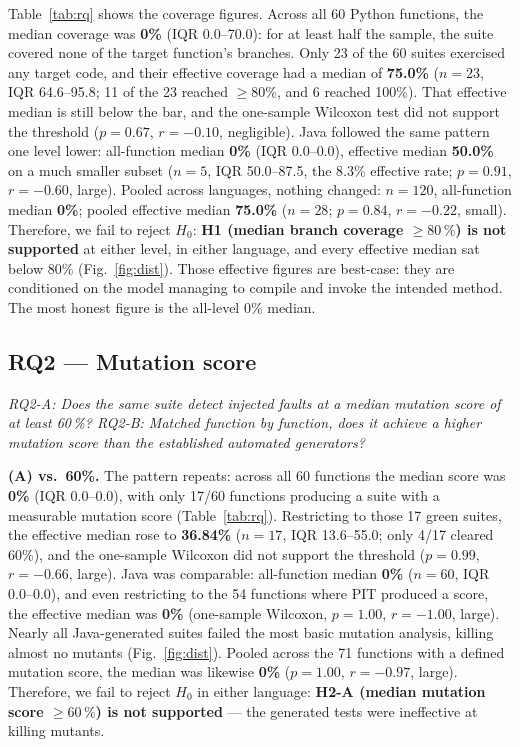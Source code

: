 Table~\ref{tab:rq} shows the coverage figures. Across all 60 Python functions, the median
coverage was \textbf{0\%} (IQR 0.0--70.0): for at least half the sample, the suite covered
none of the target function's branches. Only 23 of the 60 suites exercised any target code,
and their effective coverage had a median of \textbf{75.0\%} ($n=23$, IQR 64.6--95.8; 11 of
the 23 reached $\ge 80\%$, and 6 reached 100\%). That effective median is still below the
bar, and the one-sample Wilcoxon test did not support the threshold ($p=0.67$, $r=-0.10$,
negligible). Java followed the same pattern one level lower: all-function median
\textbf{0\%} (IQR 0.0--0.0), effective median \textbf{50.0\%} on a much smaller subset
($n=5$, IQR 50.0--87.5, the 8.3\% effective rate; $p=0.91$, $r=-0.60$, large). Pooled across
languages, nothing changed: $n=120$, all-function median \textbf{0\%}; pooled effective
median \textbf{75.0\%} ($n=28$; $p=0.84$, $r=-0.22$, small). Therefore, we fail to reject
$H_0$: \textbf{H1 (median branch coverage $\ge 80\,\%$) is not supported} at either level, in
either language, and every effective median sat below 80\% (Fig.~\ref{fig:dist}). Those
effective figures are best-case: they are conditioned on the model managing to compile and
invoke the intended method. The most honest figure is the all-level 0\% median.

\subsection{RQ2 --- Mutation score}
\emph{RQ2-A: Does the same suite detect injected faults at a median mutation score of at
least 60\,\%? RQ2-B: Matched function by function, does it achieve a higher mutation score
than the established automated generators?}

\textbf{(A) vs.\ 60\%.} The pattern repeats: across all 60 functions the median score was
\textbf{0\%} (IQR 0.0--0.0), with only 17/60 functions producing a suite with a measurable
mutation score (Table~\ref{tab:rq}). Restricting to those 17 green suites, the effective
median rose to \textbf{36.84\%} ($n=17$, IQR 13.6--55.0; only 4/17 cleared 60\%), and the
one-sample Wilcoxon did not support the threshold ($p=0.99$, $r=-0.66$, large). Java was
comparable: all-function median \textbf{0\%} ($n=60$, IQR 0.0--0.0), and even restricting to
the 54 functions where PIT produced a score, the effective median was \textbf{0\%}
(one-sample Wilcoxon, $p=1.00$, $r=-1.00$, large). Nearly all Java-generated suites failed
the most basic mutation analysis, killing almost no mutants (Fig.~\ref{fig:dist}). Pooled
across the 71 functions with a defined mutation score, the median was likewise \textbf{0\%}
($p=1.00$, $r=-0.97$, large). Therefore, we fail to reject $H_0$ in either language:
\textbf{H2-A (median mutation score $\ge 60\,\%$) is not supported} --- the generated tests
were ineffective at killing mutants.

